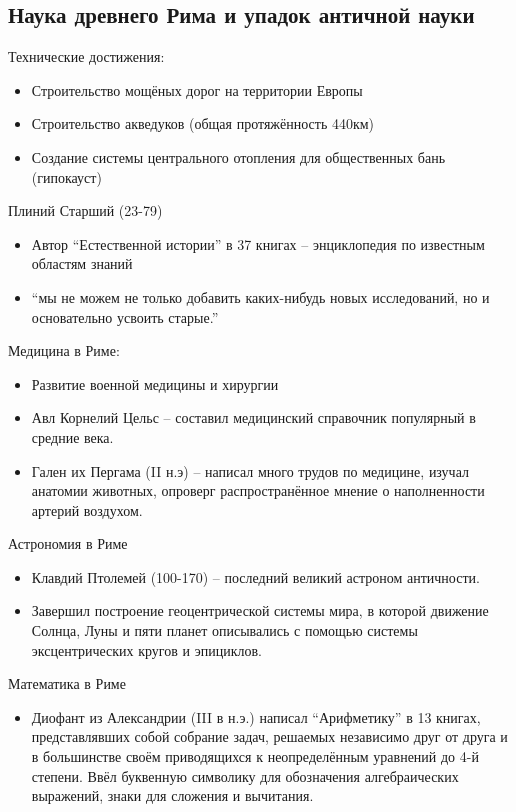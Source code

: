 \documentclass{book}
\theoremstyle{definition}
\begin{document}
    \subsection{Наука древнего Рима и упадок античной науки}

    Технические достижения:
    \begin{itemize}
        \item  Строительство мощёных дорог на территории Европы
        \item Строительство акведуков (общая протяжённость 440км)
        \item Создание системы центрального отопления для общественных бань (гипокауст)
    \end{itemize}

    Плиний Старший (23-79)
    \begin{itemize}
        \item  Автор ``Естественной истории'' в 37 книгах -- энциклопедия по известным областям знаний
        \item ``мы не можем не только добавить каких-нибудь новых исследований, но и основательно усвоить старые.''
    \end{itemize}

    Медицина в Риме:
    \begin{itemize}
        \item Развитие военной медицины и хирургии
        \item Авл Корнелий Цельс -- составил медицинский справочник популярный в средние века.
        \item Гален их Пергама (II н.э) -- написал много трудов по медицине, изучал анатомии животных, опроверг распространённое мнение о наполненности артерий воздухом.
    \end{itemize}

    Астрономия в Риме
    \begin{itemize}
        \item Клавдий Птолемей (100-170) -- последний великий астроном античности.
        \item Завершил построение геоцентрической системы мира, в которой движение Солнца, Луны и пяти планет описывались с помощью системы эксцентрических кругов и эпициклов.
    \end{itemize}

    Математика в Риме
    \begin{itemize}
        \item Диофант из Александрии (III в н.э.) написал ``Арифметику'' в 13 книгах, представлявших собой собрание задач, решаемых независимо друг от друга и в большинстве своём приводящихся к неопределённым уравнений до 4-й степени. Ввёл буквенную символику для обозначения алгебраических выражений, знаки для сложения и вычитания.
    \end{itemize}
\end{document}

